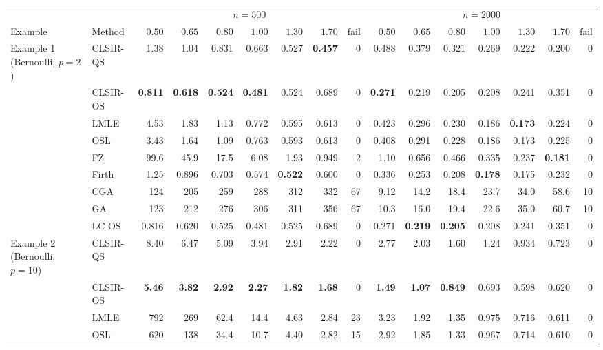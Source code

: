 \begin{tabular}{llrrrrrrrrrrrrrr}
\toprule
& & \multicolumn{7}{c}{$n=500$} & \multicolumn{7}{c}{$n=2000$}\\
\cmidrule(lr){3-9}\cmidrule(lr){10-16}
Example & Method & $0.50$ & $0.65$ & $0.80$ & $1.00$ & $1.30$ & $1.70$ & fail & $0.50$ & $0.65$ & $0.80$ & $1.00$ & $1.30$ & $1.70$ & fail\\
\midrule
Example 1 (Bernoulli, $p=2$) & CLSIR-QS & 1.38 & 1.04 & 0.831 & 0.663 & 0.527 & \textbf{0.457} & 0 & 0.488 & 0.379 & 0.321 & 0.269 & 0.222 & 0.200 & 0\\
 & CLSIR-OS & \textbf{0.811} & \textbf{0.618} & \textbf{0.524} & \textbf{0.481} & 0.524 & 0.689 & 0 & \textbf{0.271} & 0.219 & 0.205 & 0.208 & 0.241 & 0.351 & 0\\
 & LMLE & 4.53 & 1.83 & 1.13 & 0.772 & 0.595 & 0.613 & 0 & 0.423 & 0.296 & 0.230 & 0.186 & \textbf{0.173} & 0.224 & 0\\
 & OSL & 3.43 & 1.64 & 1.09 & 0.763 & 0.593 & 0.613 & 0 & 0.408 & 0.291 & 0.228 & 0.186 & 0.173 & 0.225 & 0\\
 & FZ & 99.6 & 45.9 & 17.5 & 6.08 & 1.93 & 0.949 & 2 & 1.10 & 0.656 & 0.466 & 0.335 & 0.237 & \textbf{0.181} & 0\\
 & Firth & 1.25 & 0.896 & 0.703 & 0.574 & \textbf{0.522} & 0.600 & 0 & 0.336 & 0.253 & 0.208 & \textbf{0.178} & 0.175 & 0.232 & 0\\
 & CGA & 124 & 205 & 259 & 288 & 312 & 332 & 67 & 9.12 & 14.2 & 18.4 & 23.7 & 34.0 & 58.6 & 10\\
 & GA & 123 & 212 & 276 & 306 & 311 & 356 & 67 & 10.3 & 16.0 & 19.4 & 22.6 & 35.0 & 60.7 & 10\\
 & LC-OS & 0.816 & 0.620 & 0.525 & 0.481 & 0.525 & 0.689 & 0 & 0.271 & \textbf{0.219} & \textbf{0.205} & 0.208 & 0.241 & 0.351 & 0\\
\addlinespace
Example 2 (Bernoulli, $p=10$) & CLSIR-QS & 8.40 & 6.47 & 5.09 & 3.94 & 2.91 & 2.22 & 0 & 2.77 & 2.03 & 1.60 & 1.24 & 0.934 & 0.723 & 0\\
 & CLSIR-OS & \textbf{5.46} & \textbf{3.82} & \textbf{2.92} & \textbf{2.27} & \textbf{1.82} & \textbf{1.68} & 0 & \textbf{1.49} & \textbf{1.07} & \textbf{0.849} & 0.693 & 0.598 & 0.620 & 0\\
 & LMLE & 792 & 269 & 62.4 & 14.4 & 4.63 & 2.84 & 23 & 3.23 & 1.92 & 1.35 & 0.975 & 0.716 & 0.611 & 0\\
 & OSL & 620 & 138 & 34.4 & 10.7 & 4.40 & 2.82 & 15 & 2.92 & 1.85 & 1.33 & 0.967 & 0.714 & 0.610 & 0\\

\end{tabular}
